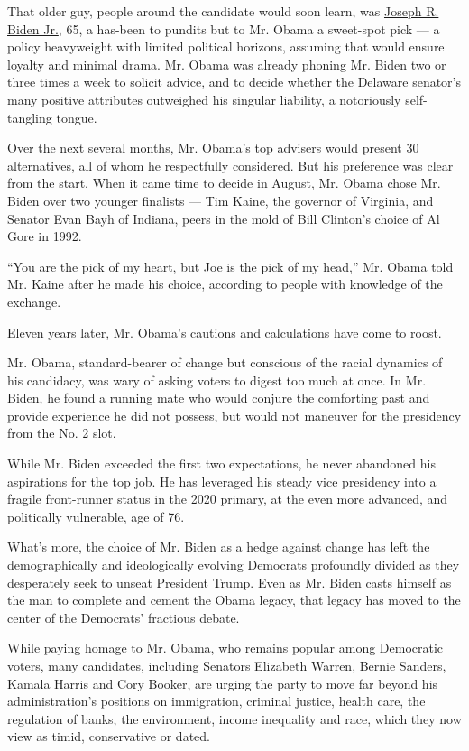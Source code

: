 That older guy, people around the candidate would soon learn, was
\href{https://www.nytimes.com/2020/07/23/arts/television/biden-obama-reunion-video.html}{Joseph
R. Biden Jr.}, 65, a has-been to pundits but to Mr. Obama a sweet-spot
pick --- a policy heavyweight with limited political horizons, assuming
that would ensure loyalty and minimal drama. Mr. Obama was already
phoning Mr. Biden two or three times a week to solicit advice, and to
decide whether the Delaware senator's many positive attributes
outweighed his singular liability, a notoriously self-tangling tongue.

Over the next several months, Mr. Obama's top advisers would present 30
alternatives, all of whom he respectfully considered. But his preference
was clear from the start. When it came time to decide in August, Mr.
Obama chose Mr. Biden over two younger finalists --- Tim Kaine, the
governor of Virginia, and Senator Evan Bayh of Indiana, peers in the
mold of Bill Clinton's choice of Al Gore in 1992.

``You are the pick of my heart, but Joe is the pick of my head,'' Mr.
Obama told Mr. Kaine after he made his choice, according to people with
knowledge of the exchange.

Eleven years later, Mr. Obama's cautions and calculations have come to
roost.

Mr. Obama, standard-bearer of change but conscious of the racial
dynamics of his candidacy, was wary of asking voters to digest too much
at once. In Mr. Biden, he found a running mate who would conjure the
comforting past and provide experience he did not possess, but would not
maneuver for the presidency from the No. 2 slot.

While Mr. Biden exceeded the first two expectations, he never abandoned
his aspirations for the top job. He has leveraged his steady vice
presidency into a fragile front-runner status in the 2020 primary, at
the even more advanced, and politically vulnerable, age of 76.

What's more, the choice of Mr. Biden as a hedge against change has left
the demographically and ideologically evolving Democrats profoundly
divided as they desperately seek to unseat President Trump. Even as Mr.
Biden casts himself as the man to complete and cement the Obama legacy,
that legacy has moved to the center of the Democrats' fractious debate.

While paying homage to Mr. Obama, who remains popular among Democratic
voters, many candidates, including Senators Elizabeth Warren, Bernie
Sanders, Kamala Harris and Cory Booker, are urging the party to move far
beyond his administration's positions on immigration, criminal justice,
health care, the regulation of banks, the environment, income inequality
and race, which they now view as timid, conservative or dated.

